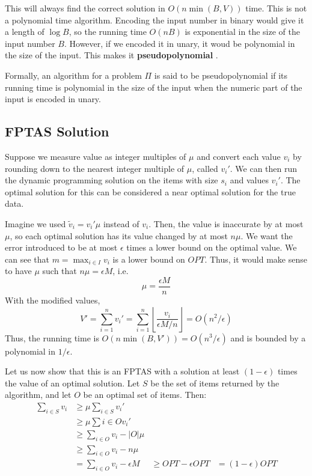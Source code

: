 \documentclass[12pt,letterpaper]{article}
\theoremstyle{definition}
\begin{document}
This will always find the correct solution in $O(n \min(B,V))$ time. This is not a polynomial time algorithm. Encoding the input number in binary would give it a length of $\log B$, so the running time $O(nB)$ is exponential in the size of the input number $B$. However, if we encoded it in unary, it woud be polynomial in the size of the input. This makes it \textbf{pseudopolynomial} .

Formally, an algorithm for a problem $\Pi$ is said to be pseudopolynomial if its running time is polynomial in the size of the input when the numeric part of the input is encoded in unary.

\subsection{FPTAS Solution} 

Suppose we measure value as integer multiples of $\mu$ and convert each value $v_i$ by rounding down to the nearest integer multiple of $\mu$, called $v_i'$. We can then run the dynamic programming solution on the items with size $s_i$ and values $v_i'$. The optimal solution for this can be considered a near optimal solution for the true data.

Imagine we used $\tilde{v}_i = v_i' \mu$ instead of $v_i$. Then, the value is inaccurate by at most $\mu$, so each optimal solution has its value changed by at most $n \mu$. We want the error introduced to be at most $\epsilon$ times a lower bound on the optimal value. We can see that $m = \max_{i \in I} v_i$ is a lower bound on $OPT$. Thus, it would make sense to have $\mu$ such that $n \mu = \epsilon M$, i.e.
\[\mu =\frac{\epsilon M}{n}\]
With the modified values,
\[V' = \sum_{i=1}^n v_i' = \sum_{i=1}^n \left \lfloor \frac{v_i}{\epsilon M /n} \right \rfloor = O(n^2/\epsilon)\]
Thus, the running time is $O(n \min(B,V')) = O(n^3 / \epsilon)$ and is bounded by a polynomial in $1/\epsilon$.

Let us now show that this is an FPTAS with a solution at least $(1- \epsilon)$ times the value of an optimal solution. Let $S$ be the set of items returned by the algorithm, and let $O$ be an optimal set of items. Then:
\begin{align*}
  \sum_{i \in S} v_i &\geq \mu \sum_{i \in S} v_i'  \\
                     &\geq \mu \sum{i \in O} v_i' \\
                     &\geq \sum_{i \in O} v_i - |O| \mu \\
                     &\geq \sum_{i \in O} v_i - n \mu \\
                     &= \sum_{i \in O} v_i - \epsilon M
                     &\geq OPT - \epsilon OPT
                     &= (1-\epsilon) OPT
\end{align*}
\end{document}
